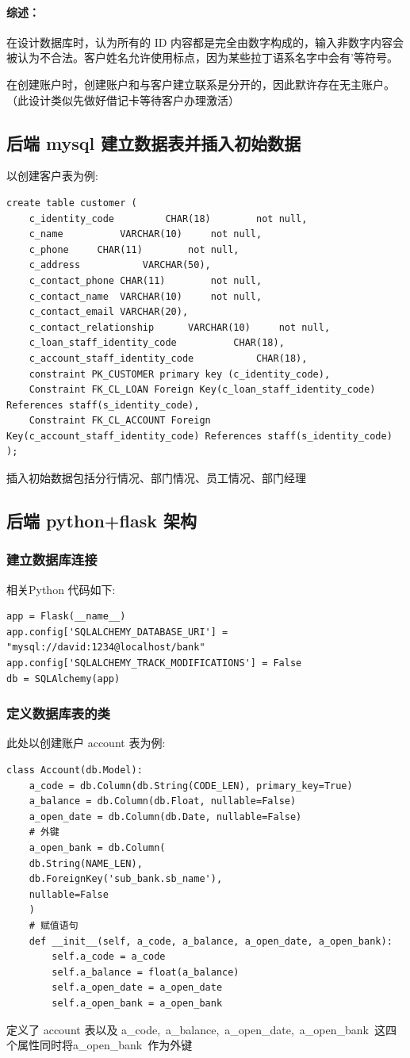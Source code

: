 \documentclass{article}
\begin{document}
	\paragraph{综述：}在设计数据库时，认为所有的 ID 内容都是完全由数字构成的，输入非数字内容会被认为不合法。客户姓名允许使用标点，因为某些拉丁语系名字中会有'等符号。
	\par{在创建账户时，创建账户和与客户建立联系是分开的，因此默许存在无主账户。（此设计类似先做好借记卡等待客户办理激活）}
	\subsection{后端 mysql 建立数据表并插入初始数据}
	以创建客户表为例:\\
	\lstset{language=Python}
	\begin{lstlisting}
create table customer (
	c_identity_code			CHAR(18)		not null,
	c_name			VARCHAR(10)		not null,
	c_phone		CHAR(11)		not null,
	c_address			VARCHAR(50),
	c_contact_phone	CHAR(11)		not null,
	c_contact_name	VARCHAR(10)		not null,
	c_contact_email	VARCHAR(20),
	c_contact_relationship		VARCHAR(10)		not null,
	c_loan_staff_identity_code			CHAR(18),
	c_account_staff_identity_code			CHAR(18),
	constraint PK_CUSTOMER primary key (c_identity_code),
	Constraint FK_CL_LOAN Foreign Key(c_loan_staff_identity_code) References staff(s_identity_code),
	Constraint FK_CL_ACCOUNT Foreign Key(c_account_staff_identity_code) References staff(s_identity_code)
);
	\end{lstlisting}
	插入初始数据包括分行情况、部门情况、员工情况、部门经理
	\subsection{后端 python+flask 架构}
	\subsubsection{建立数据库连接}
	相关Python 代码如下:\\
	\begin{verbatim}
app = Flask(__name__)
app.config['SQLALCHEMY_DATABASE_URI'] = "mysql://david:1234@localhost/bank"
app.config['SQLALCHEMY_TRACK_MODIFICATIONS'] = False
db = SQLAlchemy(app)
	\end{verbatim}
	\subsubsection{定义数据库表的类}
	此处以创建账户 account 表为例:\\
	\lstset{language=Python}
	\begin{lstlisting}
class Account(db.Model):
	a_code = db.Column(db.String(CODE_LEN), primary_key=True)
	a_balance = db.Column(db.Float, nullable=False)
	a_open_date = db.Column(db.Date, nullable=False)
	# 外键
	a_open_bank = db.Column(
	db.String(NAME_LEN),
	db.ForeignKey('sub_bank.sb_name'),
	nullable=False
	)
	# 赋值语句
	def __init__(self, a_code, a_balance, a_open_date, a_open_bank):
		self.a_code = a_code
		self.a_balance = float(a_balance)
		self.a_open_date = a_open_date
		self.a_open_bank = a_open_bank
	\end{lstlisting}
	定义了 account 表以及 a\_code,\ a\_balance,\ a\_open\_date,\ a\_open\_bank\ 这四个属性同时将a\_open\_bank\ 作为外键
\end{document}
